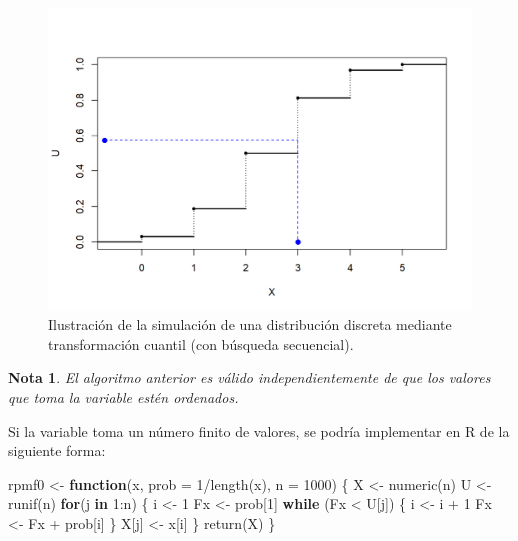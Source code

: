 \documentclass[
  10pt,
]{book}
\newenvironment{Shaded}{\begin{snugshade}}{\end{snugshade}}
\newcommand{\AttributeTok}[1]{\textcolor[rgb]{0.77,0.63,0.00}{#1}}
\newcommand{\ControlFlowTok}[1]{\textcolor[rgb]{0.13,0.29,0.53}{\textbf{#1}}}
\newcommand{\DecValTok}[1]{\textcolor[rgb]{0.00,0.00,0.81}{#1}}
\newcommand{\FunctionTok}[1]{\textcolor[rgb]{0.00,0.00,0.00}{#1}}
\newcommand{\NormalTok}[1]{#1}
\newcommand{\OtherTok}[1]{\textcolor[rgb]{0.56,0.35,0.01}{#1}}
\newcommand{\SpecialCharTok}[1]{\textcolor[rgb]{0.00,0.00,0.00}{#1}}
\theoremstyle{break}
\theoremstyle{nonumberplain}
\newtheorem{remark}{Nota}
\begin{document}
\begin{figure}[!htbp]

{\centering \includegraphics[width=0.8\linewidth]{images/cuantil-sim} 

}

\caption{Ilustración de la simulación de una distribución discreta mediante transformación cuantil (con búsqueda secuencial).}\label{fig:cuantil-movie}
\end{figure}

\begin{remark}
El algoritmo anterior es válido independientemente de que los valores que toma la variable estén ordenados.
\end{remark}

Si la variable toma un número finito de valores, se podría implementar en R de la siguiente forma:

\begin{Shaded}
\begin{Highlighting}[]
\NormalTok{rpmf0 }\OtherTok{\textless{}{-}} \ControlFlowTok{function}\NormalTok{(x, }\AttributeTok{prob =} \DecValTok{1}\SpecialCharTok{/}\FunctionTok{length}\NormalTok{(x), }\AttributeTok{n =} \DecValTok{1000}\NormalTok{) \{}
\NormalTok{  X }\OtherTok{\textless{}{-}} \FunctionTok{numeric}\NormalTok{(n)}
\NormalTok{  U }\OtherTok{\textless{}{-}} \FunctionTok{runif}\NormalTok{(n)}
  \ControlFlowTok{for}\NormalTok{(j }\ControlFlowTok{in} \DecValTok{1}\SpecialCharTok{:}\NormalTok{n) \{}
\NormalTok{    i }\OtherTok{\textless{}{-}} \DecValTok{1}
\NormalTok{    Fx }\OtherTok{\textless{}{-}}\NormalTok{ prob[}\DecValTok{1}\NormalTok{]}
    \ControlFlowTok{while}\NormalTok{ (Fx }\SpecialCharTok{\textless{}}\NormalTok{ U[j]) \{}
\NormalTok{      i }\OtherTok{\textless{}{-}}\NormalTok{ i }\SpecialCharTok{+} \DecValTok{1}
\NormalTok{      Fx }\OtherTok{\textless{}{-}}\NormalTok{ Fx }\SpecialCharTok{+}\NormalTok{ prob[i]}
\NormalTok{    \}}
\NormalTok{    X[j] }\OtherTok{\textless{}{-}}\NormalTok{ x[i]}
\NormalTok{  \}}
  \FunctionTok{return}\NormalTok{(X)}
\NormalTok{\}}
\end{Highlighting}
\end{Shaded}
\end{document}
